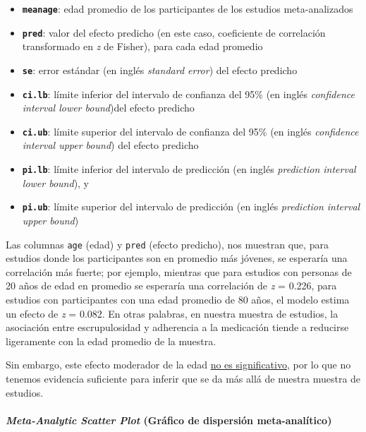 \documentclass[
  bookmarksnumbered]{article}
\begin{document}
\begin{itemize}
\item
  \textbf{\texttt{meanage}}: edad promedio de los participantes de los estudios meta-analizados
\item
  \textbf{\texttt{pred}}: valor del efecto predicho (en este caso, coeficiente de correlación transformado en \emph{z} de Fisher), para cada edad promedio
\item
  \textbf{\texttt{se}}: error estándar (en inglés \emph{standard error}) del efecto predicho
\item
  \textbf{\texttt{ci.lb}}: límite inferior del intervalo de confianza del 95\% (en inglés \emph{confidence interval lower bound})del efecto predicho
\item
  \textbf{\texttt{ci.ub}}: límite superior del intervalo de confianza del 95\% (en inglés \emph{confidence interval upper bound}) del efecto predicho
\item
  \textbf{\texttt{pi.lb}}: límite inferior del intervalo de predicción (en inglés \emph{prediction interval lower bound}), y
\item
  \textbf{\texttt{pi.ub}}: límite superior del intervalo de predicción (en inglés \emph{prediction interval upper bound})
\end{itemize}

Las columnas \texttt{age} (edad) y \texttt{pred} (efecto predicho), nos muestran que, para estudios donde los participantes son en promedio más jóvenes, se esperaría una correlación más fuerte; por ejemplo, mientras que para estudios con personas de 20 años de edad en promedio se esperaría una correlación de \emph{z} = 0.226, para estudios con participantes con una edad promedio de 80 años, el modelo estima un efecto de \emph{z} = 0.082. En otras palabras, en nuestra muestra de estudios, la asociación entre escrupulosidad y adherencia a la medicación tiende a reducirse ligeramente con la edad promedio de la muestra.

Sin embargo, este efecto moderador de la edad \underline{no es significativo}, por lo que no tenemos evidencia suficiente para inferir que se da más allá de nuestra muestra de estudios.

\hypertarget{meta-scatter}{%
\paragraph{\texorpdfstring{\emph{Meta-Analytic Scatter Plot} (Gráfico de dispersión meta-analítico)}{Meta-Analytic Scatter Plot (Gráfico de dispersión meta-analítico)}}\label{meta-scatter}}
\end{document}
